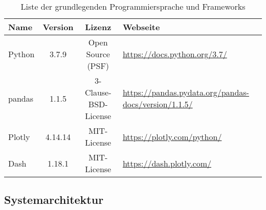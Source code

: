     \begingroup
        \setlength{\tabcolsep}{4pt} %
        \renewcommand{\arraystretch}{1.5}
        \begin{table}[h]
            \centering
            \begin{adjustbox}{max width=\textwidth}
            \Huge
            \begin{tabular}{lccl}
               \toprule
               \textbf{Name}             &{Version}    &\textbf{Lizenz}                        & \textbf{Webseite}\\
               \midrule     
                    Python               &3.7.9         &Open Source (PSF)                     & \url{https://docs.python.org/3.7/}\\
                    pandas               &1.1.5         &3-Clause-BSD-License                  & \url{https://pandas.pydata.org/pandas-docs/version/1.1.5/}\\
                    Plotly               &4.14.14       &MIT-License                           & \url{https://plotly.com/python/}\\
                    Dash                 &1.18.1        &MIT-License                           & \url{https://dash.plotly.com/}\\


                \bottomrule
            \end{tabular}
            \end{adjustbox}
            \caption{%
                Liste der grundlegenden Programmiersprache und Frameworks
            \label{tab:Software-Requirements}
            }
             \end{table}
        \endgroup
    
     
    \subsection{Systemarchitektur}
    
